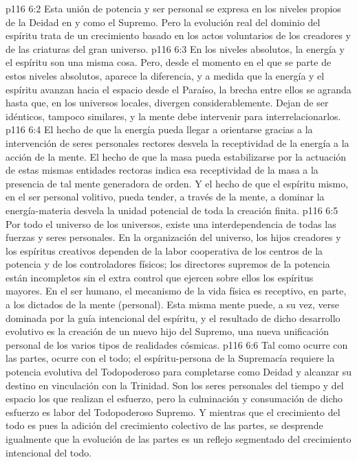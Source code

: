 \vs p116 6:2 Esta unión de potencia y ser personal se expresa en los niveles propios de la Deidad en y como el Supremo. Pero la evolución real del dominio del espíritu trata de un crecimiento basado en los actos voluntarios de los creadores y de las criaturas del gran universo.
\vs p116 6:3 \pc En los niveles absolutos, la energía y el espíritu son una misma cosa. Pero, desde el momento en el que se parte de estos niveles absolutos, aparece la diferencia, y a medida que la energía y el espíritu avanzan hacia el espacio desde el Paraíso, la brecha entre ellos se agranda hasta que, en los universos locales, divergen considerablemente. Dejan de ser idénticos, tampoco similares, y la mente debe intervenir para interrelacionarlos.
\vs p116 6:4 \pc El hecho de que la energía pueda llegar a orientarse gracias a la intervención de seres personales rectores desvela la receptividad de la energía a la acción de la mente. El hecho de que la masa pueda estabilizarse por la actuación de estas mismas entidades rectoras indica esa receptividad de la masa a la presencia de tal mente generadora de orden. Y el hecho de que el espíritu mismo, en el ser personal volitivo, pueda tender, a través de la mente, a dominar la energía\hyp{}materia desvela la unidad potencial de toda la creación finita.
\vs p116 6:5 Por todo el universo de los universos, existe una interdependencia de todas las fuerzas y seres personales. En la organización del universo, los hijos creadores y los espíritus creativos dependen de la labor cooperativa de los centros de la potencia y de los controladores físicos; los directores supremos de la potencia están incompletos sin el extra control que ejercen sobre ellos los espíritus mayores. En el ser humano, el mecanismo de la vida física es receptivo, en parte, a los dictados de la mente (personal). Esta misma mente puede, a su vez, verse dominada por la guía intencional del espíritu, y el resultado de dicho desarrollo evolutivo es la creación de un nuevo hijo del Supremo, una nueva unificación personal de los varios tipos de realidades cósmicas.
\vs p116 6:6 Tal como ocurre con las partes, ocurre con el todo; el espíritu\hyp{}persona de la Supremacía requiere la potencia evolutiva del Todopoderoso para completarse como Deidad y alcanzar su destino en vinculación con la Trinidad. Son los seres personales del tiempo y del espacio los que realizan el esfuerzo, pero la culminación y consumación de dicho esfuerzo es labor del Todopoderoso Supremo. Y mientras que el crecimiento del todo es pues la adición del crecimiento colectivo de las partes, se desprende igualmente que la evolución de las partes es un reflejo segmentado del crecimiento intencional del todo.
